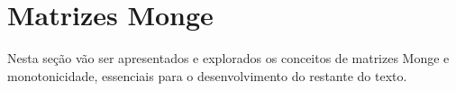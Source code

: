 \section{Matrizes Monge}
\label{MatrizMonge}


Nesta seção vão ser apresentados e explorados os conceitos de matrizes Monge e monotonicidade, essenciais para o desenvolvimento do restante do texto. 
